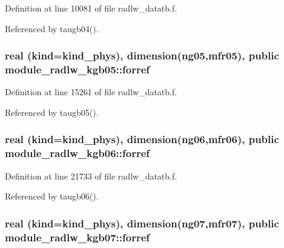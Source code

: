 Definition at line 10081 of file radlw\+\_\+datatb.\+f.



Referenced by taugb04().

\subsubsection[{\texorpdfstring{forref}{forref}}]{\setlength{\rightskip}{0pt plus 5cm}real (kind=kind\+\_\+phys), dimension(ng05,mfr05), public module\+\_\+radlw\+\_\+kgb05\+::forref}\hypertarget{group__module__radlw__main_ga6ff0c311db14b41c9bdf1170164adc3a}{}\label{group__module__radlw__main_ga6ff0c311db14b41c9bdf1170164adc3a}


Definition at line 15261 of file radlw\+\_\+datatb.\+f.



Referenced by taugb05().

\subsubsection[{\texorpdfstring{forref}{forref}}]{\setlength{\rightskip}{0pt plus 5cm}real (kind=kind\+\_\+phys), dimension(ng06,mfr06), public module\+\_\+radlw\+\_\+kgb06\+::forref}\hypertarget{group__module__radlw__main_ga6a0467b666bc75f90ae58fa4f58f07f0}{}\label{group__module__radlw__main_ga6a0467b666bc75f90ae58fa4f58f07f0}


Definition at line 21733 of file radlw\+\_\+datatb.\+f.



Referenced by taugb06().

\subsubsection[{\texorpdfstring{forref}{forref}}]{\setlength{\rightskip}{0pt plus 5cm}real (kind=kind\+\_\+phys), dimension(ng07,mfr07), public module\+\_\+radlw\+\_\+kgb07\+::forref}\hypertarget{group__module__radlw__main_ga43ceef4cb2707a2874c2d59e93ba9791}{}\label{group__module__radlw__main_ga43ceef4cb2707a2874c2d59e93ba9791}


